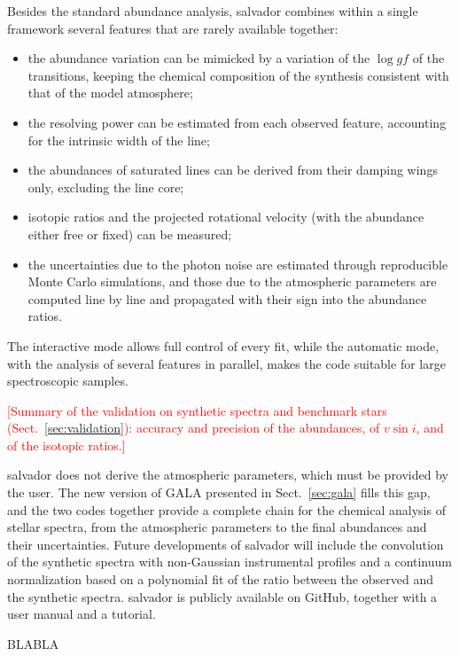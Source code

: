 \documentclass{aa}
\newcommand{\todo}[1]{\textcolor{red}{[#1]}}
\newcommand{\salvador}{salvador}   %
\begin{document}
Besides the standard abundance analysis, \salvador{} combines within a
single framework several features that are rarely available together:
\begin{itemize}
\item the abundance variation can be mimicked by a variation of the
$\log gf$ of the transitions, keeping the chemical composition of the
synthesis consistent with that of the model atmosphere;
\item the resolving power can be estimated from each observed feature,
accounting for the intrinsic width of the line;
\item the abundances of saturated lines can be derived from their
damping wings only, excluding the line core;
\item isotopic ratios and the projected rotational velocity (with the
abundance either free or fixed) can be measured;
\item the uncertainties due to the photon noise are estimated through
reproducible Monte Carlo simulations, and those due to the atmospheric
parameters are computed line by line and propagated with their sign
into the abundance ratios.
\end{itemize}
The interactive mode allows full control of every fit, while the
automatic mode, with the analysis of several features in parallel,
makes the code suitable for large spectroscopic samples.

\todo{Summary of the validation on synthetic spectra and benchmark
stars (Sect.~\ref{sec:validation}): accuracy and precision of the
abundances, of $v\sin i$, and of the isotopic ratios.}

\salvador{} does not derive the atmospheric parameters, which must be
provided by the user. The new version of GALA presented in
Sect.~\ref{sec:gala} fills this gap, and the two codes together provide
a complete chain for the chemical analysis of stellar spectra, from
the atmospheric parameters to the final abundances and their
uncertainties. Future developments of \salvador{} will include the
convolution of the synthetic spectra with non-Gaussian instrumental
profiles and a continuum normalization based on a polynomial fit of
the ratio between the observed and the synthetic spectra.
\salvador{} is publicly available on GitHub, together with a user
manual and a tutorial.


\begin{acknowledgements}
BLABLA
\end{acknowledgements}



\end{document}
